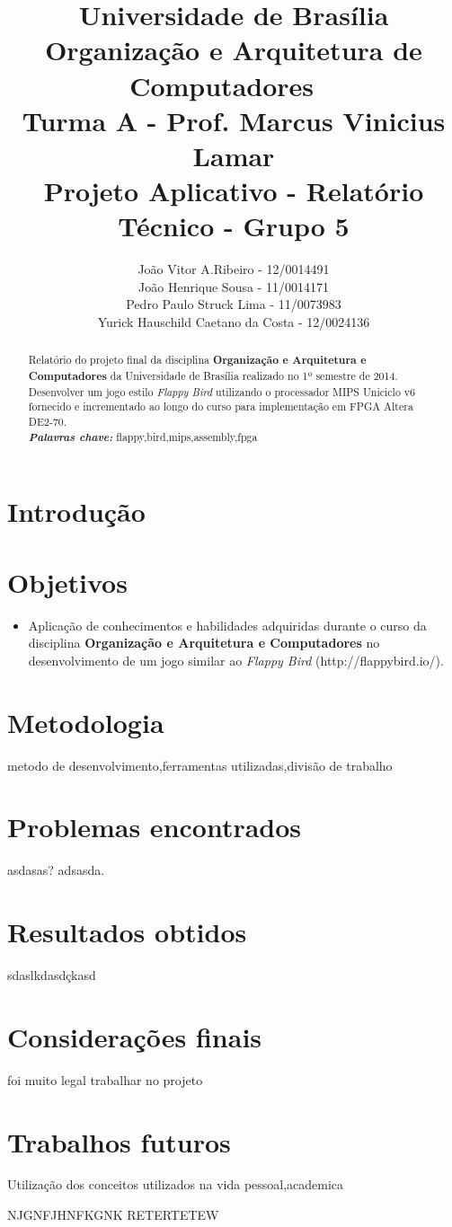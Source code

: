 \documentclass[notitlepage]{report}
\title{Universidade de Brasília \\ Organização e Arquitetura de Computadores \ \\ Turma A - Prof. Marcus Vinicius Lamar \\ \textbf{Projeto Aplicativo} - Relatório Técnico   - Grupo \textbf{5} }
\author{João Vitor A.Ribeiro - 12/0014491\\João Henrique Sousa - 11/0014171\\Pedro Paulo Struck Lima - 11/0073983\\Yurick Hauschild Caetano da Costa - 12/0024136}
\providecommand{\keywords}[1]{\textbf{\textit{Palavras chave:}} #1}
\begin{document}
\maketitle

\begin{abstract}
{Relatório do projeto final da disciplina \textbf{Organização e Arquitetura e Computadores} da Universidade de Brasília realizado no 1º semestre de 2014. Desenvolver um jogo estilo \textit {Flappy Bird} utilizando o processador MIPS Uniciclo v6 fornecido e incrementado ao longo do curso para implementação em FPGA Altera DE2-70.} \\

\keywords{flappy,bird,mips,assembly,fpga}

\end{abstract}
\pagebreak{}


\chapter{Introdução}
{}


\chapter{Objetivos}
\begin {itemize}
\item Aplicação de conhecimentos e habilidades adquiridas durante o curso da disciplina \textbf{Organização e Arquitetura e Computadores} no desenvolvimento de um jogo similar ao \textit {Flappy Bird} {(http://flappybird.io/)}.
\end{itemize}

\chapter{Metodologia}
{metodo de desenvolvimento,ferramentas utilizadas,divisão de trabalho}

\chapter{Problemas encontrados}
{asdasas? adsasda.}

\chapter{Resultados obtidos}
{sdaslkdasdçkasd}

\chapter{Considerações finais}
{foi muito legal trabalhar no projeto}

\chapter{Trabalhos futuros}
{Utilização dos conceitos utilizados na vida pessoal,academica}

\begin{thebibliography}{1}
\bibitem NJGNFJHNFKGNK
\bibitem RETERTETEW
\end{thebibliography}
\end{document}
